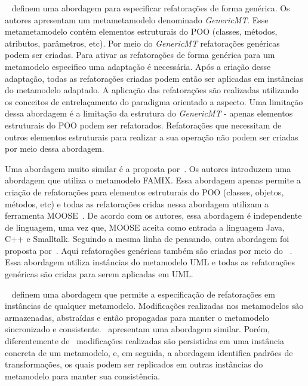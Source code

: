 ~ definem uma abordagem para especificar refatorações de forma genérica. Os autores apresentam um metametamodelo denominado \textit{GenericMT}. Esse metametamodelo contém elementos estruturais do POO (classes, métodos, atributos, parâmetros, etc). Por meio do \textit{GenericMT} refatorações genéricas podem ser criadas. Para ativar as refatorações de forma genérica para um  metamodelo especifico uma adaptação é necessária. Após a criação desse adaptação, todas as refatorações criadas podem então ser aplicadas em instâncias do metamodelo adaptado. A aplicação das refatorações são realizadas utilizando os conceitos de entrelaçamento do paradigma orientado a aspecto. Uma limitação dessa abordagem é a limitação da estrutura do \textit{GenericMT} - apenas elementos estruturais do POO podem ser refatorados. Refatorações que necessitam de outros elementos estruturais para realizar a sua operação não podem ser criadas por meio dessa abordagem.

Uma abordagem muito similar é a proposta por~. Os autores introduzem uma abordagem que utiliza o metamodelo FAMIX. Essa abordagem  apenas permite a criação de refatorações para elementos estruturais do POO (classes, objetos, métodos, etc) e todas as refatorações cridas nessa abordagem utilizam a ferramenta MOOSE~\cite{ducasse2005moose}. De acordo com os autores, essa abordagem é independente de linguagem, uma vez que, MOOSE aceita como entrada a linguagem Java, C++ e Smalltalk. Seguindo a mesma linha de pensando, outra abordagem foi proposta por~. Aqui refatorações genéricas também são criadas por meio do ~\cite{ledeczi2001generic}. Essa abordagem utiliza instâncias do metamodelo UML e todas as refatorações genéricas são cridas para serem aplicadas em UML. 


~ definem uma abordagem que permite a especificação de refatorações em instâncias de qualquer metamodelo. Modificações realizadas nos metamodelos são armazenadas, abstraídas e então propagadas para manter o metamodelo sincronizado e consistente.~ apresentam uma abordagem similar. Porém, diferentemente de~ modificações realizadas são persistidas em uma instância concreta de um metamodelo, e, em seguida, a abordagem identifica padrões de transformações, os quais podem ser replicados em outras instâncias do metamodelo para manter sua consistência.

